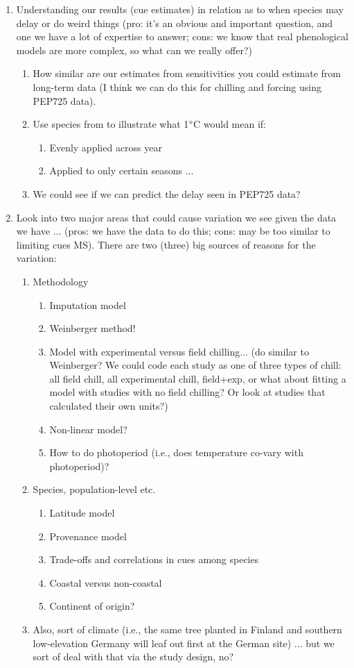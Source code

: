 \documentclass[11pt,letterpaper]{article}
\begin{document}
\begin{enumerate}
\item Understanding our results (cue estimates) in relation as to when species may delay or do weird things (pro: it's an obvious and important question, and one we have a lot of expertise to answer; cons: we know that real phenological models are more complex, so what can we really offer?) 
\begin{enumerate}
\item How similar are our estimates from sensitivities you could estimate from long-term data (I think we can do this for chilling and forcing using PEP725 data).
\item Use species from \citep{fu2015} to illustrate what 1$\degree$C would mean if:
\begin{enumerate}
\item Evenly applied across year
\item Applied to only certain seasons ... 
\end{enumerate}
\item We could see if we can predict the delay seen in PEP725 data? 
\end{enumerate}
\item Look into two major areas that could cause variation we see given the data we have ... (pros: we have the data to do this; cons: may be too similar to limiting cues MS). There are two (three) big sources of reasons for the variation:
\begin{enumerate}
\item Methodology
\begin{enumerate}
\item Imputation model
\item Weinberger method! 
\item Model with experimental versus field chilling... (do similar to Weinberger? We could code each study as one of three types of chill: all field chill, all experimental chill, field+exp, or what about fitting a model with studies with no field chilling? Or look at studies that calculated their own units?)
\item Non-linear model?
\item How to do photoperiod (i.e., does temperature co-vary with photoperiod)?
\end{enumerate}
\item Species, population-level etc.
\begin{enumerate}
\item Latitude model
\item Provenance model
\item Trade-offs and correlations in cues among species 
\item Coastal versus non-coastal
\item Continent of origin?
\end{enumerate}
\item Also, sort of climate (i.e., the same tree planted in Finland and southern low-elevation Germany will leaf out first at the German site) ... but we sort of deal with that via the study design, no?
\end{enumerate}
\end{enumerate}
\end{document}
